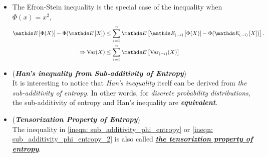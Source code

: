\documentclass[11pt]{article}
\begin{document}
\begin{itemize}
\item \begin{remark}
The Efron-Stein inequality is the special case of the inequality when $\Phi(x) = x^2$,
\begin{align*}
\E{}{\Phi(X)} - \Phi(\E{}{X}) &\le \sum_{i=1}^{n}\E{}{\E{(-i)}{\Phi(X)} - \Phi(\E{(-i)}{X})}.\\
\Rightarrow \text{Var}(X) &\le \sum_{i=1}^{n}\E{}{\text{Var}_{(-i)}(X)}
\end{align*} 
\end{remark}

\item \begin{remark} (\textbf{\emph{Han's inequality from Sub-additivity of Entropy}}) \citep{boucheron2013concentration} \\
It is interesting to notice that \emph{Han's inequality} itself can be derived from \emph{the sub-additivity of entropy}. In other words, for \emph{discrete probability distributions}, the sub-additivity of entropy and Han's inequality are \emph{\textbf{equivalent}}. 
\end{remark}

\item \begin{remark} (\textbf{\emph{Tensorization Property of Entropy}}) \citep{wainwright2019high}\\
The inequality in \eqref{ineqn: sub_additivity_phi_entropy} or \eqref{ineqn: sub_additivity_phi_entropy_2} is also called \underline{\emph{\textbf{the tensoriztion property of entropy}}}.
\end{remark}


\end{itemize}
\end{document}
